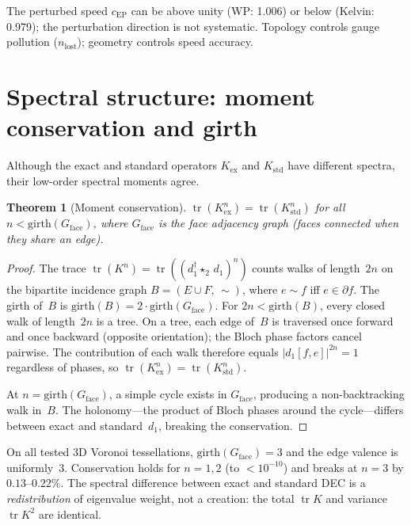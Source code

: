 \documentclass[preprint,12pt]{elsarticle}
\newtheorem{theorem}{Theorem}[section]
\DeclareMathOperator{\tr}{tr}
\begin{document}
The perturbed speed $c_{\mathrm{EP}}$ can be above unity (WP: 1.006) or
below (Kelvin: 0.979); the perturbation direction is not systematic.
Topology controls gauge pollution ($n_{\mathrm{lost}}$); geometry
controls speed accuracy.


\section{Spectral structure: moment conservation and girth}
\label{sec:spectral}

Although the exact and standard operators $K_{\mathrm{ex}}$ and
$K_{\mathrm{std}}$ have different spectra, their low-order spectral moments
agree.

\begin{theorem}[Moment conservation]
\label{thm:moments}
$\tr(K_{\mathrm{ex}}^n) = \tr(K_{\mathrm{std}}^n)$ for all
$n < \mathrm{girth}(G_{\mathrm{face}})$, where $G_{\mathrm{face}}$ is the
face adjacency graph (faces connected when they share an edge).
\end{theorem}

\begin{proof}
The trace $\tr(K^n) = \tr((d_1^\dagger \star_2\, d_1)^n)$ counts walks of
length~$2n$ on the bipartite incidence graph
$B = (E \cup F,\, \sim)$, where $e \sim f$ iff $e \in \partial f$.
The girth of~$B$ is $\mathrm{girth}(B) = 2 \cdot \mathrm{girth}(G_{\mathrm{face}})$.
For $2n < \mathrm{girth}(B)$, every closed walk of length~$2n$ is a tree.
On a tree, each edge of~$B$ is traversed once forward and once backward
(opposite orientation); the Bloch phase factors cancel pairwise.
The contribution of each walk therefore equals $|d_1[f,e]|^{2n} = 1$
regardless of phases, so $\tr(K_{\mathrm{ex}}^n) = \tr(K_{\mathrm{std}}^n)$.

At $n = \mathrm{girth}(G_{\mathrm{face}})$, a simple cycle exists in
$G_{\mathrm{face}}$, producing a non-backtracking walk in~$B$. The
holonomy---the product of Bloch phases around the cycle---differs between
exact and standard~$d_1$, breaking the conservation.
\end{proof}

On all tested 3D Voronoi tessellations, $\mathrm{girth}(G_{\mathrm{face}}) = 3$
and the edge valence is uniformly~3. Conservation holds for $n = 1, 2$
(to $< 10^{-10}$) and breaks at $n = 3$ by $0.13$--$0.22\%$.
The spectral difference between exact and standard DEC is a
\emph{redistribution} of eigenvalue weight, not a creation: the total
$\tr K$ and variance $\tr K^2$ are identical.
\end{document}
